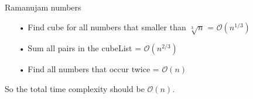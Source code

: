 \documentclass{assignment}
\begin{document}
    \begin{homeworkProblem}
    
     \begin{algorithm}[H]
 \BlankLine
{}
\caption{Ramanujam numbers} 
\end{algorithm}
    \end{homeworkProblem}
    
    \begin{enumerate}
    \item[•] Find cube for all numbers that smaller than $ \sqrt[3]{n}$ = $\mathcal{O}(n^{1/3})$
    \item[•] Sum all pairs in the cubeList = $\mathcal{O}(n^{2/3})$
    \item[•] Find all numbers that occur twice = $\mathcal{O}(n)$
    \end{enumerate}
So the total time complexity should be $\mathcal{O}(n)$.
 
    
 
\end{document}
